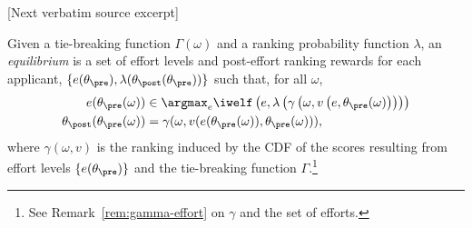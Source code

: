 \documentclass[10pt]{article}
\begin{document}
\begin{ReviewVerbatim}
{[Next verbatim source excerpt]

\begin{definition} [Equilibrium]\label{def:equi}
{Given a}
tie-breaking function $\Gamma(\omega)$
%
{and}
	a ranking probability function $\lambda$, an \textit{equilibrium} is a set of effort levels and post-effort ranking rewards for each applicant, $\{e(\theta_\pre),  \lambda(\theta_\post(\theta_\pre))\}$ such that, for all
	$\omega$, %
	\begin{align*}
		e(\theta_\pre(\omega)) &\in \argmax_{e} \iwelf\left(e, \lambda\left(\gamma\left(\omega, v\left(e,\theta_\pre(\omega)\right)\right)\right)\right) %
		\\
		\theta_\post(\theta_\pre(\omega)) &= \gamma(\omega, v(e(\theta_\pre(\omega)),\theta_\pre(\omega))),
	\end{align*}
	{where $\gamma(\omega,v)$ is the ranking induced by the CDF of the scores resulting from effort levels $\{e(\theta_\pre)\}$ and the tie-breaking function $\Gamma$.\footnote{See Remark~\ref{rem:gamma-effort} on $\gamma$ and the set of efforts.%
	}
	}
\end{definition}

}
\end{ReviewVerbatim}
\end{document}
